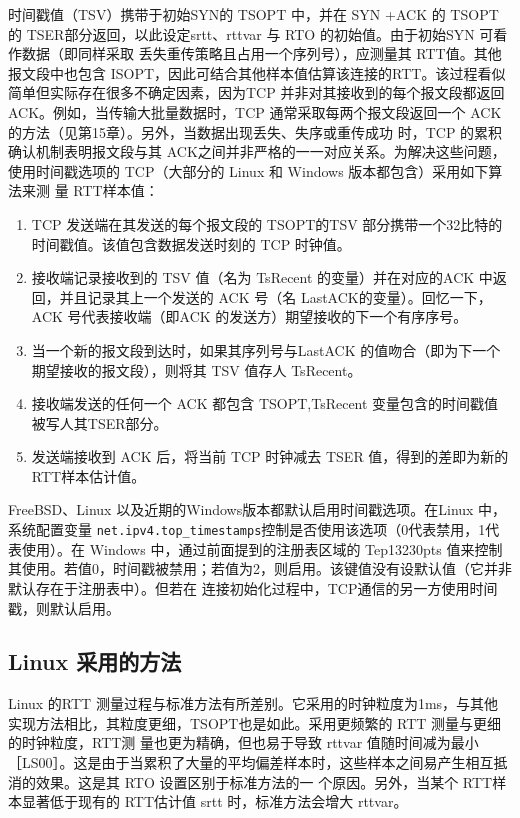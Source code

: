 时间戳值（TSV）携带于初始SYN的 TSOPT 中，并在 SYN +ACK 的 TSOPT的
TSER部分返回，以此设定srtt、rttvar 与 RTO 的初始值。由于初始SYN 可看作数据（即同样采取
丢失重传策略且占用一个序列号），应测量其 RTT值。其他报文段中也包含
ISOPT，因此可结合其他样本值估算该连接的RTT。该过程看似简单但实际存在很多不确定因素，因为TCP
并非对其接收到的每个报文段都返回 ACK。例如，当传输大批量数据时，TCP 通常采取每两个报文段返回一个 ACK
的方法（见第15章）。另外，当数据出现丢失、失序或重传成功
时，TCP 的累积确认机制表明报文段与其 ACK之间并非严格的一一对应关系。为解决这些问题，使用时间戳选项的 TCP（大部分的 Linux
和 Windows 版本都包含）采用如下算法来测
量 RTT样本值：
\begin{enumerate}
  \item TCP 发送端在其发送的每个报文段的 TSOPT的TSV 部分携带一个32比特的时间戳值。该值包含数据发送时刻的 TCP 时钟值。
  \item 接收端记录接收到的 TSV 值（名为 TsRecent 的变量）并在对应的ACK 中返回，并且记录其上一个发送的 ACK
    号（名 LastACK的变量）。回忆一下，ACK 号代表接收端（即ACK 的发送方）期望接收的下一个有序序号。
  \item 当一个新的报文段到达时，如果其序列号与LastACK 的值吻合（即为下一个期望接收的报文段），则将其 TSV 值存人 TsRecent。
  \item 接收端发送的任何一个 ACK 都包含 TSOPT,TsRecent 变量包含的时间戳值被写人其TSER部分。
  \item 发送端接收到 ACK 后，将当前 TCP 时钟减去 TSER 值，得到的差即为新的RTT样本估计值。
\end{enumerate}
FreeBSD、Linux 以及近期的Windows版本都默认启用时间戳选项。在Linux 中，系统配置变量
\verb|net.ipv4.top_timestamps|控制是否使用该选项（0代表禁用，1代表使用）。在
Windows 中，通过前面提到的注册表区域的 Tep13230pts
值来控制其使用。若值0，时间戳被禁用；若值为2，则启用。该键值没有设默认值（它并非默认存在于注册表中）。但若在
连接初始化过程中，TCP通信的另一方使用时间戳，则默认启用。

\subsection{Linux 采用的方法}

Linux 的RTT
测量过程与标准方法有所差别。它采用的时钟粒度为1ms，与其他实现方法相比，其粒度更细，TSOPT也是如此。采用更频繁的 RTT 测量与更细的时钟粒度，RTT测
量也更为精确，但也易于导致 rttvar
值随时间减为最小［LS00］。这是由于当累积了大量的平均偏差样本时，这些样本之间易产生相互抵消的效果。这是其 RTO 设置区别于标准方法的一
个原因。另外，当某个 RTT样本显著低于现有的 RTT估计值 srtt 时，标准方法会增大 rttvar。

